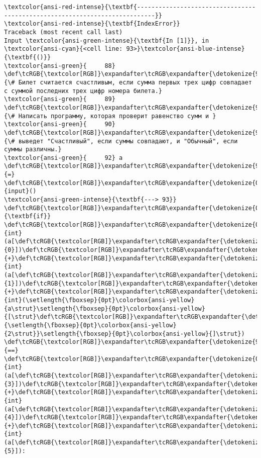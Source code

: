 \documentclass[11pt]{article}
\begin{document}
    \begin{Verbatim}[commandchars=\\\{\}, frame=single, framerule=2mm, rulecolor=\color{outerrorbackground}]
\textcolor{ansi-red-intense}{\textbf{---------------------------------------------------------------------------}}
\textcolor{ansi-red-intense}{\textbf{IndexError}}                                Traceback (most recent call last)
Input \textcolor{ansi-green-intense}{\textbf{In [1]}}, in \textcolor{ansi-cyan}{<cell line: 93>}\textcolor{ansi-blue-intense}{\textbf{()}}
\textcolor{ansi-green}{     88} \def\tcRGB{\textcolor[RGB]}\expandafter\tcRGB\expandafter{\detokenize{95,135,135}}{\# Билет считается счастливым, если сумма первых трех цифр совпадает с суммой последних трех цифр номера билета.}
\textcolor{ansi-green}{     89} \def\tcRGB{\textcolor[RGB]}\expandafter\tcRGB\expandafter{\detokenize{95,135,135}}{\# Написать программу, которая проверит равенство сумм и }
\textcolor{ansi-green}{     90} \def\tcRGB{\textcolor[RGB]}\expandafter\tcRGB\expandafter{\detokenize{95,135,135}}{\# выведет "Счастливый", если суммы совпадают, и "Обычный", если суммы различны.}
\textcolor{ansi-green}{     92} a \def\tcRGB{\textcolor[RGB]}\expandafter\tcRGB\expandafter{\detokenize{98,98,98}}{=} \def\tcRGB{\textcolor[RGB]}\expandafter\tcRGB\expandafter{\detokenize{0,135,0}}{input}()
\textcolor{ansi-green-intense}{\textbf{---> 93}} \def\tcRGB{\textcolor[RGB]}\expandafter\tcRGB\expandafter{\detokenize{0,135,0}}{\textbf{if}} \def\tcRGB{\textcolor[RGB]}\expandafter\tcRGB\expandafter{\detokenize{0,135,0}}{int}(a[\def\tcRGB{\textcolor[RGB]}\expandafter\tcRGB\expandafter{\detokenize{98,98,98}}{0}])\def\tcRGB{\textcolor[RGB]}\expandafter\tcRGB\expandafter{\detokenize{98,98,98}}{+}\def\tcRGB{\textcolor[RGB]}\expandafter\tcRGB\expandafter{\detokenize{0,135,0}}{int}(a[\def\tcRGB{\textcolor[RGB]}\expandafter\tcRGB\expandafter{\detokenize{98,98,98}}{1}])\def\tcRGB{\textcolor[RGB]}\expandafter\tcRGB\expandafter{\detokenize{98,98,98}}{+}\def\tcRGB{\textcolor[RGB]}\expandafter\tcRGB\expandafter{\detokenize{0,135,0}}{int}(\setlength{\fboxsep}{0pt}\colorbox{ansi-yellow}{a\strut}\setlength{\fboxsep}{0pt}\colorbox{ansi-yellow}{[\strut}\def\tcRGB{\textcolor[RGB]}\expandafter\tcRGB\expandafter{\detokenize{98,98,98}}{\setlength{\fboxsep}{0pt}\colorbox{ansi-yellow}{2\strut}}\setlength{\fboxsep}{0pt}\colorbox{ansi-yellow}{]\strut}) \def\tcRGB{\textcolor[RGB]}\expandafter\tcRGB\expandafter{\detokenize{98,98,98}}{==} \def\tcRGB{\textcolor[RGB]}\expandafter\tcRGB\expandafter{\detokenize{0,135,0}}{int}(a[\def\tcRGB{\textcolor[RGB]}\expandafter\tcRGB\expandafter{\detokenize{98,98,98}}{3}])\def\tcRGB{\textcolor[RGB]}\expandafter\tcRGB\expandafter{\detokenize{98,98,98}}{+}\def\tcRGB{\textcolor[RGB]}\expandafter\tcRGB\expandafter{\detokenize{0,135,0}}{int}(a[\def\tcRGB{\textcolor[RGB]}\expandafter\tcRGB\expandafter{\detokenize{98,98,98}}{4}])\def\tcRGB{\textcolor[RGB]}\expandafter\tcRGB\expandafter{\detokenize{98,98,98}}{+}\def\tcRGB{\textcolor[RGB]}\expandafter\tcRGB\expandafter{\detokenize{0,135,0}}{int}(a[\def\tcRGB{\textcolor[RGB]}\expandafter\tcRGB\expandafter{\detokenize{98,98,98}}{5}]):

\end{Verbatim}
\end{document}
